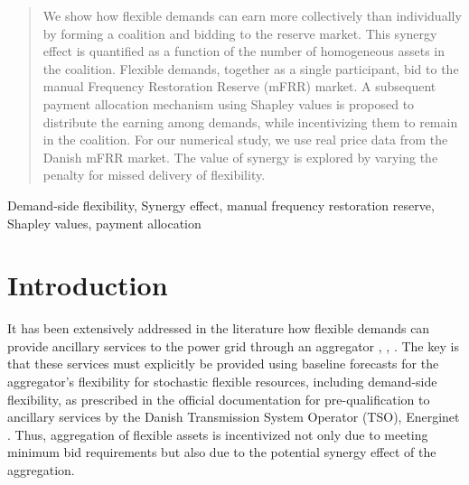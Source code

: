 \documentclass[lettersize,journal]{IEEEtran}
\begin{document}
\begin{abstract}
    We show how flexible demands can earn more collectively than individually by forming a coalition and bidding to the reserve market. This synergy effect is quantified as a function of the number of homogeneous assets in the coalition. Flexible demands, together as a single participant, bid to the manual Frequency Restoration Reserve (mFRR) market. A subsequent payment allocation mechanism using Shapley values is proposed to distribute the earning among demands, while incentivizing them to remain in the coalition. For our numerical study, we use real price data from the Danish mFRR market. The value of synergy is explored by varying the penalty for missed delivery of flexibility.
\end{abstract}

\begin{IEEEkeywords}
    Demand-side flexibility, Synergy effect, manual frequency restoration reserve, Shapley values, payment allocation
\end{IEEEkeywords}

\tableofcontents

\section{Introduction}\label{sec:Introduction}

It has been extensively addressed in the literature how flexible demands can provide ancillary services to the power grid through an aggregator \cite{biegel2014value}, \cite{macdonald2020demand}, \cite{balijepalli2011review}.
The key is that these services must explicitly be provided using baseline forecasts for the aggregator's flexibility for stochastic flexible resources, including demand-side flexibility, as prescribed in the official documentation for pre-qualification to ancillary services by  the Danish Transmission System Operator (TSO), Energinet \cite{energinet:prequalification}. Thus, aggregation of flexible assets is incentivized not only due to meeting minimum bid requirements \cite{energinet:Systemydelser} but also due to the potential synergy effect of the aggregation.
\end{document}
